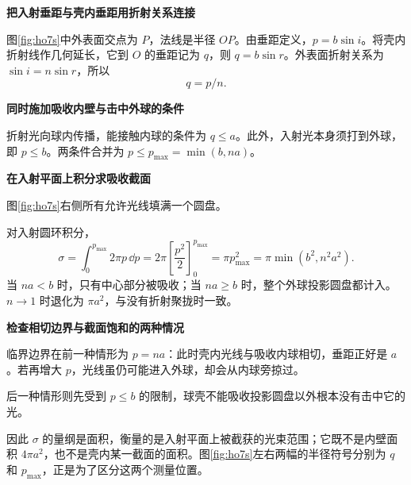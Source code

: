 \begin{solution}\textbf{把入射垂距与壳内垂距用折射关系连接}\par\nobreak
图\ref{fig:ho7s}中外表面交点为 $P$，法线是半径 $OP$。由垂距定义，$p=b\sin i$。将壳内折射线作几何延长，它到 $O$ 的垂距记为 $q$，则 $q=b\sin r$。外表面折射关系为 $\sin i=n\sin r$，所以
\[
q=p/n.
\]


\par\medskip{}\noindent\textbf{同时施加吸收内壁与击中外球的条件}\par\nobreak
折射光向球内传播，能接触内球的条件为 $q\le a$。此外，入射光本身须打到外球，即 $p\le b$。两条件合并为 $p\le p_{\max}=\min(b,na)$。



\par\medskip{}\noindent\textbf{在入射平面上积分求吸收截面}\par\nobreak
图\ref{fig:ho7s}右侧所有允许光线填满一个圆盘。

对入射圆环积分，
\[
\boxed{\sigma=\int_0^{p_{\max}}2\pi p\,\dd p
=2\pi\left[\frac{p^2}{2}\right]_0^{p_{\max}}
=\pi p_{\max}^2=\pi\min(b^2,n^2a^2).}
\]
当 $na<b$ 时，只有中心部分被吸收；当 $na\ge b$ 时，整个外球投影圆盘都计入。$n\to1$ 时退化为 $\pi a^2$，与没有折射聚拢时一致。


\par\medskip{}\noindent\textbf{检查相切边界与截面饱和的两种情况}\par\nobreak
临界边界在前一种情形为 $p=na$：此时壳内光线与吸收内球相切，垂距正好是 $a$。若再增大 $p$，光线虽仍可能进入外球，却会从内球旁掠过。

后一种情形则先受到 $p\le b$ 的限制，球壳不能吸收投影圆盘以外根本没有击中它的光。

因此 $\sigma$ 的量纲是面积，衡量的是入射平面上被截获的光束范围；它既不是内壁面积 $4\pi a^2$，也不是壳内某一截面的面积。图\ref{fig:ho7s}左右两幅的半径符号分别为 $q$ 和 $p_{\max}$，正是为了区分这两个测量位置。
\end{solution}

